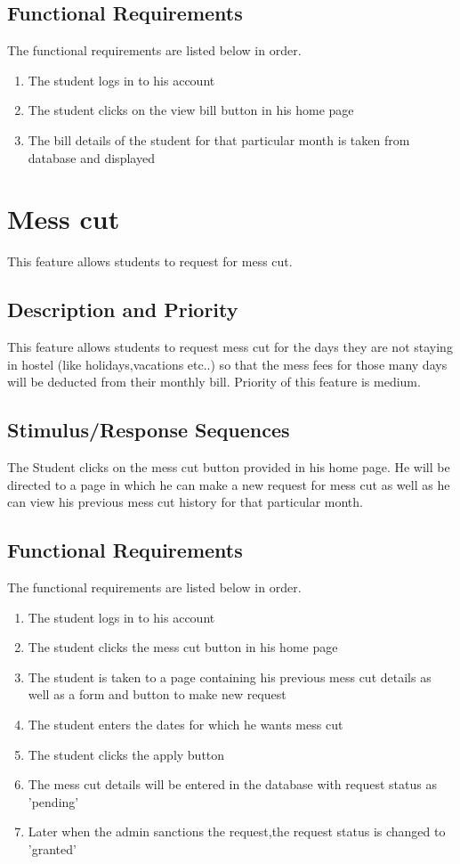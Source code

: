 \documentclass{scrreprt}
\begin{document}
\subsection{Functional Requirements}
The functional requirements are listed below in order.

\begin{enumerate}
    \item The student logs in to his account
    \item The student clicks on the view bill button in his home page
    \item The bill details of the student for that particular month is taken from database and displayed 
    
\end{enumerate} 

\section{Mess cut}
This feature allows students to request for mess cut.

\subsection{Description and Priority}
This feature allows students to request mess cut for the days they are not staying in hostel (like holidays,vacations etc..) so that the mess fees for those many days will be deducted from their monthly bill. Priority of this feature is medium.

\subsection{Stimulus/Response Sequences}
The Student clicks on the mess cut button provided in his home page. He will be directed to a page in which he can make a new request for mess cut as well as he can view his previous mess cut history for that particular month.

\subsection{Functional Requirements}
The functional requirements are listed below in order.

\begin{enumerate}
    \item The student logs in to his account 
    \item The student clicks the mess cut button in his home page
    \item The student is taken to a page containing his previous mess cut details as well as a form and button to make new request 
    \item The student enters the dates for which he wants mess cut  
    \item The student clicks the apply button
    \item The mess cut details will be entered in the database with request status as 'pending'
    \item Later when the admin sanctions the request,the request status is changed to 'granted'
\end{enumerate} 
\end{document}
